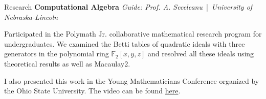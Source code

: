 \begin{rubric}{Research}
\entry*[2021] \textbf{Computational Algebra} \hfill \emph{Guide: Prof. A. Seceleanu} \,|\, \emph{University of Nebraska-Lincoln}

Participated in the Polymath Jr. collaborative mathematical research program for undergraduates. We examined the Betti tables of quadratic ideals with three generators in the polynomial ring $\mathbb{F}_{2}[x, y, z]$ and resolved all these ideals using theoretical results as well as Macaulay2. %

I also presented this work in the Young Mathematicians Conference organized by the Ohio State University. The video can be found \href{https://www.youtube.com/watch?v=ax-zScZtL7Q}{here}.

\end{rubric}